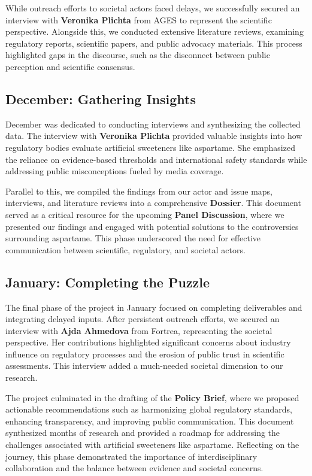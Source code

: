 While outreach efforts to societal actors faced delays, we successfully secured an interview with \textbf{Veronika Plichta} from AGES to represent the scientific perspective. Alongside this, we conducted extensive literature reviews, examining regulatory reports, scientific papers, and public advocacy materials. This process highlighted gaps in the discourse, such as the disconnect between public perception and scientific consensus.

\subsection*{December: Gathering Insights}
December was dedicated to conducting interviews and synthesizing the collected data. The interview with \textbf{Veronika Plichta} provided valuable insights into how regulatory bodies evaluate artificial sweeteners like aspartame. She emphasized the reliance on evidence-based thresholds and international safety standards while addressing public misconceptions fueled by media coverage.

Parallel to this, we compiled the findings from our actor and issue maps, interviews, and literature reviews into a comprehensive \textbf{Dossier}. This document served as a critical resource for the upcoming \textbf{Panel Discussion}, where we presented our findings and engaged with potential solutions to the controversies surrounding aspartame. This phase underscored the need for effective communication between scientific, regulatory, and societal actors.

\subsection*{January: Completing the Puzzle}
The final phase of the project in January focused on completing deliverables and integrating delayed inputs. After persistent outreach efforts, we secured an interview with \textbf{Ajda Ahmedova} from Fortrea, representing the societal perspective. Her contributions highlighted significant concerns about industry influence on regulatory processes and the erosion of public trust in scientific assessments. This interview added a much-needed societal dimension to our research.

The project culminated in the drafting of the \textbf{Policy Brief}, where we proposed actionable recommendations such as harmonizing global regulatory standards, enhancing transparency, and improving public communication. This document synthesized months of research and provided a roadmap for addressing the challenges associated with artificial sweeteners like aspartame. Reflecting on the journey, this phase demonstrated the importance of interdisciplinary collaboration and the balance between evidence and societal concerns.

\printbibliography

